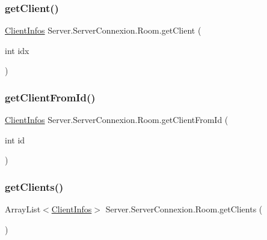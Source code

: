 \subsubsection{\texorpdfstring{get\+Client()}{getClient()}}
{\footnotesize\ttfamily \mbox{\hyperlink{classServer_1_1ServerConnexion_1_1ClientInfos}{Client\+Infos}} Server.\+Server\+Connexion.\+Room.\+get\+Client (\begin{DoxyParamCaption}\item[{int}]{idx }\end{DoxyParamCaption})\hspace{0.3cm}{\ttfamily [inline]}}

\mbox{\label{classServer_1_1ServerConnexion_1_1Room_a60fc7bece76f7b765c2d32501af4d960}} 
\subsubsection{\texorpdfstring{get\+Client\+From\+Id()}{getClientFromId()}}
{\footnotesize\ttfamily \mbox{\hyperlink{classServer_1_1ServerConnexion_1_1ClientInfos}{Client\+Infos}} Server.\+Server\+Connexion.\+Room.\+get\+Client\+From\+Id (\begin{DoxyParamCaption}\item[{int}]{id }\end{DoxyParamCaption})\hspace{0.3cm}{\ttfamily [inline]}}

\mbox{\label{classServer_1_1ServerConnexion_1_1Room_aa8d4955026b246208bfda5e6a1199e86}} 
\subsubsection{\texorpdfstring{get\+Clients()}{getClients()}}
{\footnotesize\ttfamily Array\+List$<$\mbox{\hyperlink{classServer_1_1ServerConnexion_1_1ClientInfos}{Client\+Infos}}$>$ Server.\+Server\+Connexion.\+Room.\+get\+Clients (\begin{DoxyParamCaption}{ }\end{DoxyParamCaption})\hspace{0.3cm}{\ttfamily [inline]}}

